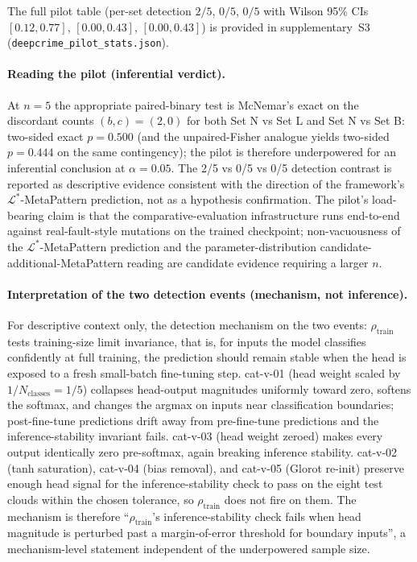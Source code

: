 \documentclass[acmsmall,screen,review]{acmart}
\begin{document}
The full pilot table (per-set detection $2/5$, $0/5$, $0/5$ with Wilson 95\% CIs $[0.12,0.77]$, $[0.00,0.43]$, $[0.00,0.43]$) is provided in supplementary~S3 (\texttt{deepcrime\_pilot\_stats.json}).

\paragraph{Reading the pilot (inferential verdict).}
At $n=5$ the appropriate paired-binary test is McNemar's exact on the discordant counts $(b, c) = (2, 0)$ for both Set N vs Set L and Set N vs Set B: two-sided exact $p = 0.500$ (and the unpaired-Fisher analogue yields two-sided $p = 0.444$ on the same contingency); the pilot is therefore underpowered for an inferential conclusion at $\alpha = 0.05$. The 2/5 vs 0/5 vs 0/5 detection contrast is reported as descriptive evidence consistent with the direction of the framework's $\mathcal{L}^{*}$-MetaPattern prediction, not as a hypothesis confirmation. The pilot's load-bearing claim is that the comparative-evaluation infrastructure runs end-to-end against real-fault-style mutations on the trained checkpoint; non-vacuousness of the $\mathcal{L}^{*}$-MetaPattern prediction and the parameter-distribution candidate-additional-MetaPattern reading are candidate evidence requiring a larger $n$.

\paragraph{Interpretation of the two detection events (mechanism, not inference).}
For descriptive context only, the detection mechanism on the two events: $\rho_{\mathrm{train}}$ tests training-size limit invariance, that is, for inputs the model classifies confidently at full training, the prediction should remain stable when the head is exposed to a fresh small-batch fine-tuning step. cat-v-01 (head weight scaled by $1/N_{\mathrm{classes}}=1/5$) collapses head-output magnitudes uniformly toward zero, softens the softmax, and changes the argmax on inputs near classification boundaries; post-fine-tune predictions drift away from pre-fine-tune predictions and the inference-stability invariant fails. cat-v-03 (head weight zeroed) makes every output identically zero pre-softmax, again breaking inference stability. cat-v-02 (tanh saturation), cat-v-04 (bias removal), and cat-v-05 (Glorot re-init) preserve enough head signal for the inference-stability check to pass on the eight test clouds within the chosen tolerance, so $\rho_{\mathrm{train}}$ does not fire on them. The mechanism is therefore ``$\rho_{\mathrm{train}}$'s inference-stability check fails when head magnitude is perturbed past a margin-of-error threshold for boundary inputs'', a mechanism-level statement independent of the underpowered sample size.
\end{document}
